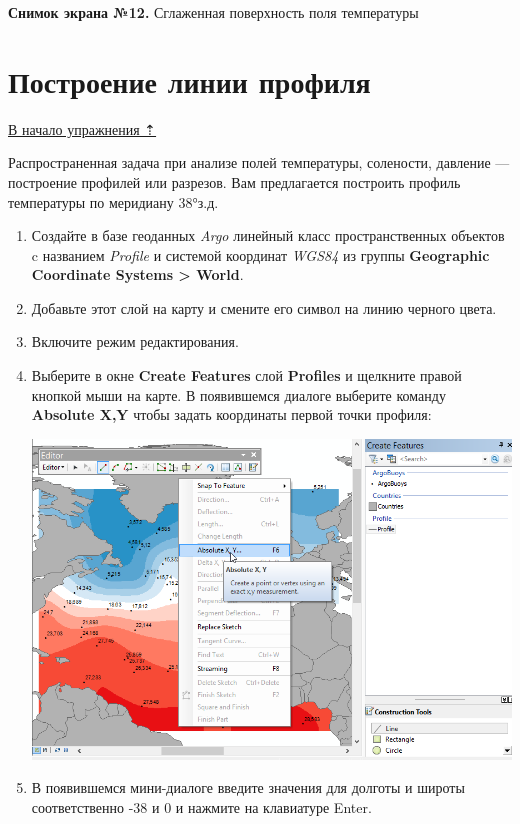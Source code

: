 \documentclass[]{book}
\theoremstyle{definition}
\theoremstyle{definition}
\theoremstyle{definition}
\theoremstyle{remark}
\begin{document}
\begin{enumerate}
  \textbf{Снимок экрана №12.} Сглаженная поверхность поля температуры
\end{enumerate}

\hypertarget{interpolation-profile}{%
\section{Построение линии профиля}\label{interpolation-profile}}

\protect\hyperlink{interpolation}{В начало упражнения ⇡}

Распространенная задача при анализе полей температуры, солености,
давление --- построение профилей или разрезов. Вам предлагается
построить профиль температуры по меридиану 38°з.д.

\begin{enumerate}
\def\labelenumi{\arabic{enumi}.}
\item
  Создайте в базе геоданных \emph{Argo} линейный класс пространственных
  объектов c названием \emph{Profile} и системой координат \emph{WGS84}
  из группы \textbf{Geographic Coordinate Systems \textgreater{} World}.
\item
  Добавьте этот слой на карту и смените его символ на линию черного
  цвета.
\item
  Включите режим редактирования.
\item
  Выберите в окне \textbf{Create Features} слой \textbf{Profiles} и
  щелкните правой кнопкой мыши на карте. В появившемся диалоге выберите
  команду \textbf{Absolute X,Y} чтобы задать координаты первой точки
  профиля:

  \includegraphics{images/Ex16/image17.png}
\item
  В появившемся мини-диалоге введите значения для долготы и широты
  соответственно -38 и 0 и нажмите на клавиатуре Enter.


\end{enumerate}
\end{document}
